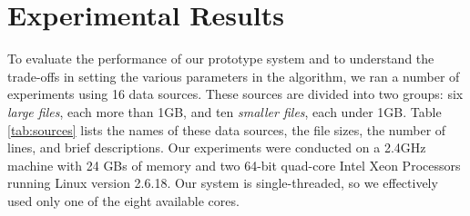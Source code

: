 \section{Experimental Results}
\label{sec:eval}

To evaluate the performance of our prototype system and to understand the
trade-offs in setting the various parameters in the algorithm, we ran a number
of experiments using 16 data sources. These sources are divided into two groups:
six {\em large files}, each more than 1GB, 
and ten {\em smaller files}, each under 1GB. 
Table \ref{tab:sources} lists the names of these data sources, the file sizes,
the number of lines, and brief descriptions. Our experiments were
conducted on a 2.4GHz machine with 24 GBs of memory and two 64-bit quad-core Intel Xeon Processors 
running Linux version 2.6.18. Our system is single-threaded, so we effectively used only one of the eight available cores.

